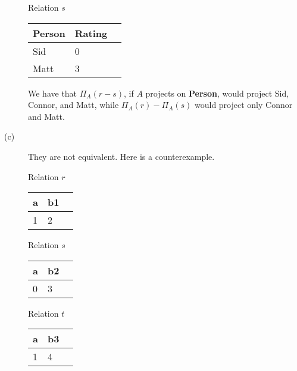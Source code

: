 \documentclass{article}
\begin{document}
\begin{description}
        \begin{center}
            Relation $s$
            \begin{tabular}{ | l | l | p{5cm} |}
                \hline
                \textbf{Person} & \textbf{Rating} \\ \hline
                Sid & 0 \\ \hline
                Matt & 3 \\ \hline
            \end{tabular}
        \end{center}

        We have that $\Pi_{A}(r-s)$, if $A$ projects on \textbf{Person}, would
        project Sid, Connor, and Matt, while $\Pi_{A}(r) - \Pi_{A}(s)$ would project
        only Connor and Matt.
    \item[(c)]
        They are not equivalent. Here is a counterexample.

        \begin{center}
            Relation $r$
            \begin{tabular}{ | l | l | p{5cm} |}
                \hline
                \textbf{a} & \textbf{b1} \\ \hline
                1 & 2 \\ \hline
            \end{tabular}
        \end{center}

        \begin{center}
            Relation $s$
            \begin{tabular}{ | l | l | p{5cm} |}
                \hline
                \textbf{a} & \textbf{b2} \\ \hline
                0 & 3 \\ \hline
            \end{tabular}
        \end{center}

        \begin{center}
            Relation $t$
            \begin{tabular}{ | l | l | p{5cm} |}
                \hline
                \textbf{a} & \textbf{b3} \\ \hline
                1 & 4 \\ \hline
            \end{tabular}
        \end{center}


\end{description}
\end{document}
